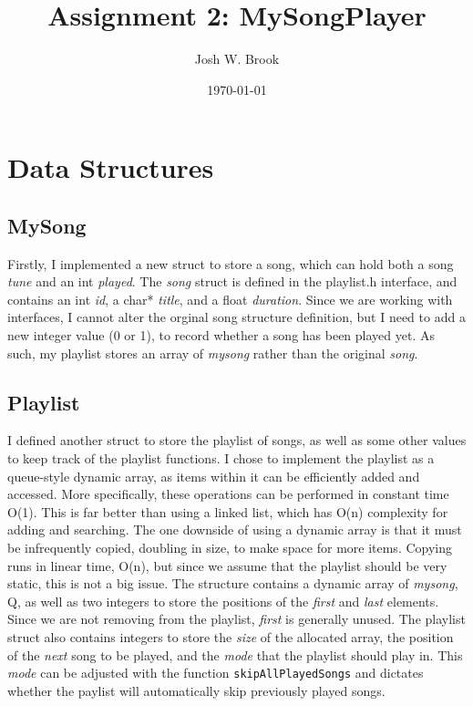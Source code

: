 \documentclass[11pt]{article}
\author{Josh W. Brook}
\date{\today}
\title{\textbf{Assignment 2: MySongPlayer}}
\begin{document}
\maketitle

\section{Data Structures}
\label{sec:org179905e}

\subsection{MySong}
\label{sec:orgdbdd6a5}

Firstly, I implemented a new struct to store a song, which can hold both a song \emph{tune} and an int \emph{played}.
The \emph{song} struct is defined in the playlist.h interface, and contains an int \emph{id}, a char* \emph{title}, and a float \emph{duration}.
Since we are working with interfaces, I cannot alter the orginal song structure definition, but I need to add a new integer value (0 or 1), to record whether a song has been played yet.
As such, my playlist stores an array of \emph{mysong} rather than the original \emph{song}.

\subsection{Playlist}
\label{sec:org7dc4e0b}

I defined another struct to store the playlist of songs, as well as some other values to keep track of the playlist functions.
I chose to implement the playlist as a queue-style dynamic array, as items within it can be efficiently added and accessed. 
More specifically, these operations can be performed in constant time O(1).
This is far better than using a linked list, which has O(n) complexity for adding and searching.
The one downside of using a dynamic array is that it must be infrequently copied, doubling in size, to make space for more items.
Copying runs in linear time, O(n), but since we assume that the playlist should be very static, this is not a big issue.
The structure contains a dynamic array of \emph{mysong}, Q, as well as two integers to store the positions of the \emph{first} and \emph{last} elements.
Since we are not removing from the playlist, \emph{first} is generally unused.
The playlist struct also contains integers to store the \emph{size} of the allocated array, the position of the \emph{next} song to be played, and the \emph{mode} that the playlist should play in.
This \emph{mode} can be adjusted with the function \texttt{skipAllPlayedSongs} and dictates whether the paylist will automatically skip previously played songs.
\end{document}
